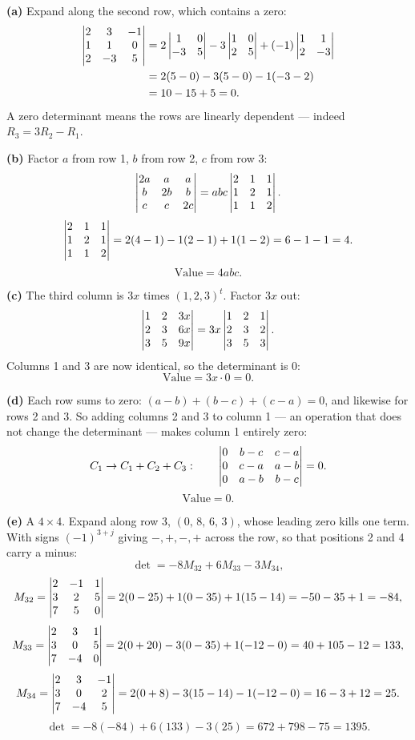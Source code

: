 \begin{solution}
\textbf{(a)} Expand along the second row, which contains a zero:
\[
\begin{aligned}
\begin{vmatrix}2&3&-1\\1&1&0\\2&-3&5\end{vmatrix}
&=2\begin{vmatrix}1&0\\-3&5\end{vmatrix}-3\begin{vmatrix}1&0\\2&5\end{vmatrix}+(-1)\begin{vmatrix}1&1\\2&-3\end{vmatrix}\\
&=2(5-0)-3(5-0)-1(-3-2)\\
&=10-15+5=0 .
\end{aligned}
\]
A zero determinant means the rows are linearly dependent --- indeed
$R_3=3R_2-R_1$.

\medskip
\textbf{(b)} Factor $a$ from row 1, $b$ from row 2, $c$ from row 3:
\[
\begin{vmatrix}2a&a&a\\b&2b&b\\c&c&2c\end{vmatrix}=abc\begin{vmatrix}2&1&1\\1&2&1\\1&1&2\end{vmatrix}.
\]
\[
\begin{vmatrix}2&1&1\\1&2&1\\1&1&2\end{vmatrix}=2(4-1)-1(2-1)+1(1-2)=6-1-1=4 .
\]
\[
\text{Value}=4abc .
\]

\medskip
\textbf{(c)} The third column is $3x$ times $(1,2,3)^{t}$. Factor $3x$ out:
\[
\begin{vmatrix}1&2&3x\\2&3&6x\\3&5&9x\end{vmatrix}=3x\begin{vmatrix}1&2&1\\2&3&2\\3&5&3\end{vmatrix}.
\]
Columns 1 and 3 are now identical, so the determinant is 0:
\[
\text{Value}=3x\cdot 0=0 .
\]

\medskip
\textbf{(d)} Each row sums to zero:
$(a-b)+(b-c)+(c-a)=0$, and likewise for rows 2 and 3. So adding columns 2 and 3
to column 1 --- an operation that does not change the determinant --- makes
column 1 entirely zero:
\[
C_1\to C_1+C_2+C_3:\qquad
\begin{vmatrix}0&b-c&c-a\\0&c-a&a-b\\0&a-b&b-c\end{vmatrix}=0 .
\]
\[
\text{Value}=0 .
\]

\medskip
\textbf{(e)} A $4\times4$. Expand along row 3, $(0,\,8,\,6,\,3)$, whose leading
zero kills one term. With signs $(-1)^{3+j}$ giving $-,+,-,+$ across the row,
so that positions 2 and 4 carry a minus:
\[
\det = -8M_{32}+6M_{33}-3M_{34},
\]
\[
M_{32}=\begin{vmatrix}2&-1&1\\3&2&5\\7&5&0\end{vmatrix}
=2(0-25)+1(0-35)+1(15-14)=-50-35+1=-84,
\]
\[
M_{33}=\begin{vmatrix}2&3&1\\3&0&5\\7&-4&0\end{vmatrix}
=2(0+20)-3(0-35)+1(-12-0)=40+105-12=133,
\]
\[
M_{34}=\begin{vmatrix}2&3&-1\\3&0&2\\7&-4&5\end{vmatrix}
=2(0+8)-3(15-14)-1(-12-0)=16-3+12=25 .
\]
\[
\det=-8(-84)+6(133)-3(25)=672+798-75=1395 .
\]


\end{solution}
